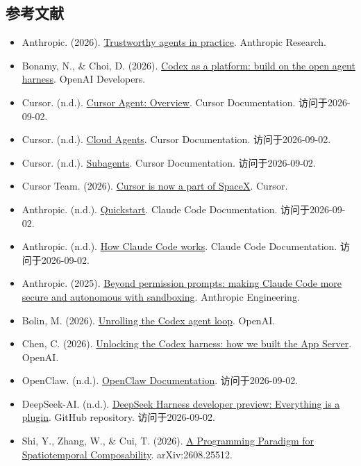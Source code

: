 \FloatBarrier
{}
\hypertarget{ux53c2ux8003ux6587ux732e-118}{%
\subsection{参考文献}\label{ux53c2ux8003ux6587ux732e-118}}

\vspace{0.25em}
\begin{itemize}
\tightlist
\item
  Anthropic. (2026). \href{https://www.anthropic.com/research/trustworthy-agents}{Trustworthy agents in practice}. Anthropic Research.
\item
  Bonamy, N., \& Choi, D. (2026). \href{https://developers.openai.com/blog/codex-as-a-platform}{Codex as a platform: build on the open agent harness}. OpenAI Developers.
\item
  Cursor. (n.d.). \href{https://cursor.com/docs/agent/overview}{Cursor Agent: Overview}. Cursor Documentation. 访问于2026-09-02.
\item
  Cursor. (n.d.). \href{https://cursor.com/docs/cloud-agent}{Cloud Agents}. Cursor Documentation. 访问于2026-09-02.
\item
  Cursor. (n.d.). \href{https://cursor.com/docs/subagents}{Subagents}. Cursor Documentation. 访问于2026-09-02.
\item
  Cursor Team. (2026). \href{https://cursor.com/blog/joining-spacex}{Cursor is now a part of SpaceX}. Cursor.
\item
  Anthropic. (n.d.). \href{https://code.claude.com/docs/en/quickstart}{Quickstart}. Claude Code Documentation. 访问于2026-09-02.
\item
  Anthropic. (n.d.). \href{https://code.claude.com/docs/en/how-claude-code-works}{How Claude Code works}. Claude Code Documentation. 访问于2026-09-02.
\item
  Anthropic. (2025). \href{https://www.anthropic.com/engineering/claude-code-sandboxing}{Beyond permission prompts: making Claude Code more secure and autonomous with sandboxing}. Anthropic Engineering.
\item
  Bolin, M. (2026). \href{https://openai.com/index/unrolling-the-codex-agent-loop/}{Unrolling the Codex agent loop}. OpenAI.
\item
  Chen, C. (2026). \href{https://openai.com/index/unlocking-the-codex-harness/}{Unlocking the Codex harness: how we built the App Server}. OpenAI.
\item
  OpenClaw. (n.d.). \href{https://docs.openclaw.ai/}{OpenClaw Documentation}. 访问于2026-09-02.
\item
  DeepSeek-AI. (n.d.). \href{https://github.com/deepseek-ai/deepseek-harness}{DeepSeek Harness developer preview: Everything is a plugin}. GitHub repository. 访问于2026-09-02.
\item
  Shi, Y., Zhang, W., \& Cui, T. (2026). \href{https://arxiv.org/abs/2608.25512}{A Programming Paradigm for Spatiotemporal Composability}. arXiv:2608.25512.
\end{itemize}

\clearpage
